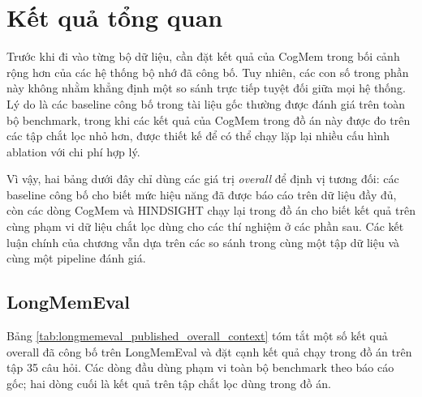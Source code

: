 \documentclass[../main.tex]{subfiles}
\begin{document}
\section{Kết quả tổng quan}

Trước khi đi vào từng bộ dữ liệu, cần đặt kết quả của CogMem trong bối cảnh rộng hơn của các hệ thống bộ nhớ đã công bố. Tuy nhiên, các con số trong phần này không nhằm khẳng định một so sánh trực tiếp tuyệt đối giữa mọi hệ thống. Lý do là các baseline công bố trong tài liệu gốc thường được đánh giá trên toàn bộ benchmark, trong khi các kết quả của CogMem trong đồ án này được đo trên các tập chắt lọc nhỏ hơn, được thiết kế để có thể chạy lặp lại nhiều cấu hình ablation với chi phí hợp lý.

Vì vậy, hai bảng dưới đây chỉ dùng các giá trị \textit{overall} để định vị tương đối: các baseline công bố cho biết mức hiệu năng đã được báo cáo trên dữ liệu đầy đủ, còn các dòng CogMem và HINDSIGHT chạy lại trong đồ án cho biết kết quả trên cùng phạm vi dữ liệu chắt lọc dùng cho các thí nghiệm ở các phần sau. Các kết luận chính của chương vẫn dựa trên các so sánh trong cùng một tập dữ liệu và cùng một pipeline đánh giá.

\subsection{LongMemEval}

Bảng \ref{tab:longmemeval_published_overall_context} tóm tắt một số kết quả overall đã công bố trên LongMemEval và đặt cạnh kết quả chạy trong đồ án trên tập 35 câu hỏi. Các dòng đầu dùng phạm vi toàn bộ benchmark theo báo cáo gốc; hai dòng cuối là kết quả trên tập chắt lọc dùng trong đồ án.
\end{document}
